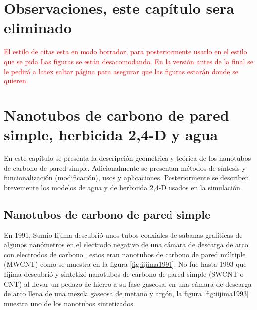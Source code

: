 % 
% 

\chapter{Observaciones, este capítulo sera eliminado}
\textcolor{red}{El estilo de citas esta en modo borrador, para posteriormente usarlo en el estilo que se pida}
\textcolor{red}{Las figuras se están desacomodando. En la versión antes de la final se le pedirá a latex saltar página para asegurar que las figuras estarán donde se quieren.}



\chapter{Nanotubos de carbono de pared simple, herbicida 2,4-D y agua}

En este capítulo se presenta la descripción geométrica y teórica de los nanotubos de carbono de pared simple. Adicionalmente se presentan métodos de síntesis y funcionalización (modificación), usos y aplicaciones. Posteriormente se describen brevemente los modelos de agua y de herbicida 2,4-D usados en la simulación.\\


\section{Nanotubos de carbono de pared simple}


En 1991, Sumio Iijima descubrió unos tubos coaxiales de sábanas grafíticas de algunos nanómetros en el electrodo negativo de una cámara de descarga de arco con electrodos de carbono  \cite{Iijima1991}; estos eran nanotubos de carbono de pared múltiple (MWCNT) como se muestra en la figura \ref{fig:iijima1991}. No fue hasta 1993 que Iijima descubrió y sintetizó nanotubos de carbono de pared simple (SWCNT o CNT) \cite{Iijima1993} al llevar un pedazo de hierro a su fase gaseosa, en una cámara de descarga de arco llena de una mezcla gaseosa de metano y argón, la figura \ref{fig:iijima1993} muestra uno de los nanotubos sintetizados.\\

